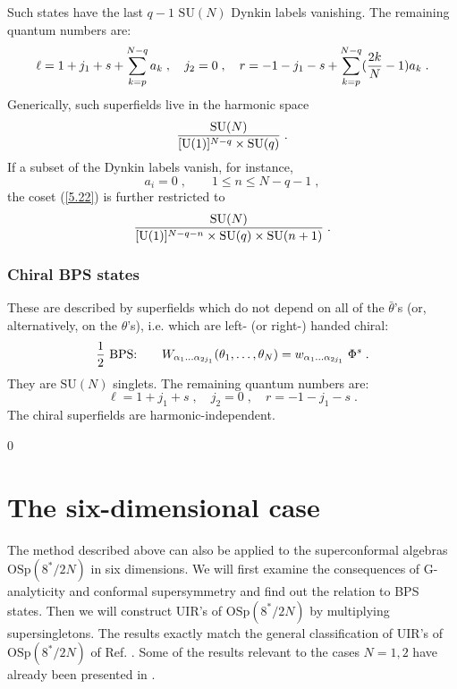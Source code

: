 \documentclass[a4paper,12pt]{article}
\begin{document}
Such states have the last $q-1$ $\mbox{SU}(N)$ Dynkin labels 
vanishing. The remaining quantum numbers are: 
\begin{equation}\label{5.26}
  \ell = 1+j_1+s+\sum_{k=p}^{N-q}a_k\;, \quad j_2=0\;, 
\quad r = -1-j_1-s+\sum_{k=p}^{N-q}({2k\over 
N}-1)a_k\;. 
\end{equation}
Generically, such superfields live in the harmonic space 
\begin{equation}\label{5.27}
{\mbox{SU}(N)\over [\mbox{U}(1)]^{N-q}\times  \mbox{SU}(q)}\;.   
\end{equation}
If a subset of the Dynkin labels vanish, for instance,
$$
a_{i}= 0\;, \qquad 1 \leq n\leq N-q-1\;, 
$$
the coset (\ref{5.22}) is further restricted to 
\begin{equation}\label{5.28}
{\mbox{SU}(N)\over [\mbox{U}(1)]^{N-q-n}\times  \mbox{SU}(q)\times 
\mbox{SU}(n+1)}\;.   
\end{equation} 

\subsubsection{Chiral BPS states} 

These are described by superfields which do not depend on all of 
the $\bar\theta$'s (or, alternatively, on the $\theta$'s), i.e. 
which are left- (or right-) handed chiral: 
\begin{equation}\label{5.29}
{1\over 2}\mbox{ BPS:}\qquad W_{\alpha_1\ldots\alpha_{2j_1}} 
(\theta_{1},\ldots,\theta_{N}) = 
w_{\alpha_1\ldots\alpha_{2j_1}}\;\Phi^s\;.  
\end{equation}
They are $\mbox{SU}(N)$ singlets. The remaining quantum numbers 
are: 
\begin{equation}\label{5.30}
  \ell = 1+j_1+s\;, \quad j_2=0\;, \quad r = -1-j_1-s\;. 
\end{equation}
The chiral superfields are harmonic-independent.






\setcounter{equation}0 
\section{The six-dimensional case}
 
The method described above can also be applied to the 
superconformal algebras $\mbox{OSp}(8^*/2N)$ in six dimensions. We 
will first examine the consequences of G-analyticity and conformal 
supersymmetry and find out the relation to BPS states. Then we 
will construct UIR's of $\mbox{OSp}(8^*/2N)$ by multiplying 
supersingletons. The results exactly match the general 
classification of UIR's of $\mbox{OSp}(8^*/2N)$ of Ref. 
\cite{Minw2}. Some of the results relevant to the cases $N=1,2$  
have already been presented in \cite{FS3}.  
\end{document}

